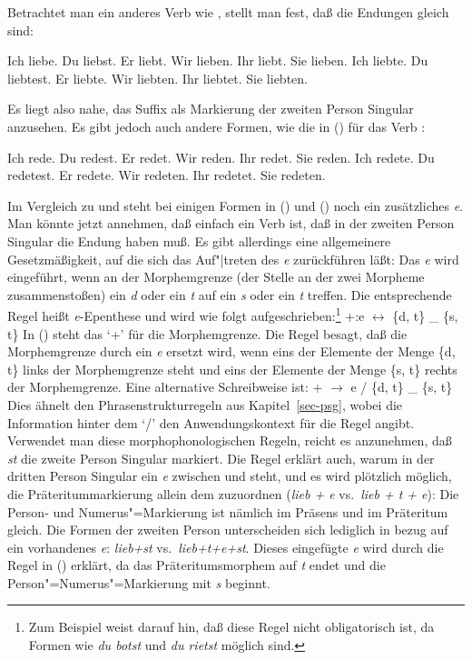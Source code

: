 \noindent
Betrachtet man ein anderes Verb wie \zb {}, stellt man fest, daß die
Endungen gleich sind:
\begin{multicols}{2}
\eal
\ex Ich liebe.
\ex Du  liebst.
\ex Er  liebt.
\ex Wir lieben.
\ex Ihr liebt.
\ex Sie lieben.
\zl
\eal
\ex Ich liebte.
\ex Du  liebtest.
\ex Er  liebte.
\ex Wir liebten.
\ex Ihr liebtet.
\ex Sie liebten.
\zl
\end{multicols}
\noindent
Es liegt also nahe, \zb das Suffix  als Markierung der zweiten Person Singular
anzusehen. Es gibt jedoch auch andere Formen, wie die in () für das Verb :
\begin{multicols}{2}
\eal
\ex Ich rede.
\ex Du  redest.
\ex Er  redet.
\ex Wir reden.
\ex Ihr redet.
\ex Sie reden.
\zl
\eal
\ex Ich redete.
\ex Du  redetest.
\ex Er  redete.
\ex Wir redeten.
\ex Ihr redetet.
\ex Sie redeten.
\zl
\end{multicols}
\noindent
Im Vergleich zu  und  steht bei einigen Formen in ()
und () noch ein zusätzliches \emph{e}. Man könnte jetzt annehmen, daß 
einfach ein Verb ist, daß in der zweiten Person Singular die Endung  haben
muß. Es gibt allerdings eine allgemeinere Gesetzmäßigkeit, auf die sich das Auf"|treten
des \emph{e} zurückführen läßt: Das \emph{e} wird eingeführt, wenn an der Morphemgrenze
(der Stelle an der zwei Morpheme zusammenstoßen) ein \emph{d} oder ein \emph{t} auf ein
\emph{s} oder ein \emph{t} treffen. Die entsprechende Regel heißt \emph{e}-Epenthese
und wird wie folgt aufgeschrieben:\footnote{
  Zum Beispiel \citet[]{Eisenberg98a} weist darauf hin, daß diese Regel nicht
  obligatorisch ist, da Formen wie \emph{du botst} und \emph{du rietst} möglich sind.%
}
\ea
\label{Regel-e-einfuegung}
+:e $\leftrightarrow$ \{d, t\} \_ \{s, t\}
\z
In () steht das `+' für die Morphemgrenze. Die Regel besagt, daß die Morphemgrenze
durch ein \emph{e} ersetzt wird, wenn eins der Elemente der Menge \{d, t\} links der Morphemgrenze
steht und eins der Elemente der Menge \{s, t\} rechts der Morphemgrenze.
Eine alternative Schreibweise ist:
\ea
+ $\to$ e / \{d, t\} \_ \{s, t\}
\z
Dies ähnelt den Phrasenstrukturregeln aus Kapitel~\ref{sec-psg}, wobei die Information hinter dem `/'
den Anwendungskontext für die Regel angibt. Verwendet man diese morphophonologischen Regeln,
reicht es anzunehmen, daß \emph{st} die zweite Person Singular markiert. Die Regel erklärt auch,
warum in der dritten Person Singular ein \emph{e} zwischen  und  steht,
und es wird plötzlich möglich, die Präteritummarkierung allein dem  zuzuordnen 
(\emph{lieb + e} vs.\ \emph{lieb + t + e}): Die Person- und
Numerus"=Markierung ist nämlich im Präsens und im Präteritum gleich. Die Formen der zweiten Person unterscheiden sich
lediglich in bezug auf ein vorhandenes \emph{e}: \emph{lieb+st} vs.\ \emph{lieb+t+e+st}. Dieses
eingefügte \emph{e} wird durch die Regel in () erklärt, da das Präteritumsmorphem
auf \emph{t} endet und die Person"=Numerus"=Markierung mit \emph{s} beginnt.

